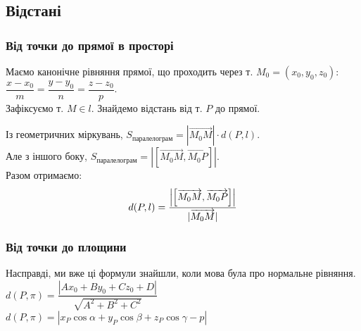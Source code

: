 \documentclass[a4paper, 10pt]{extarticle}
\theoremstyle{theoremdd}
\theoremstyle{theoremdd}
\theoremstyle{theoremdd}
\theoremstyle{theoremdd}
\theoremstyle{theoremdd}
\theoremstyle{theoremdd}
\theoremstyle{theoremdd}
\theoremstyle{theoremdd}
\begin{document}
\subsection{Відстані}
\subsubsection{Від точки до прямої в просторі}
Маємо канонічне рівняння прямої, що проходить через т. $M_0 = (x_0,y_0,z_0)$:\\
$\dfrac{x-x_0}{m} = \dfrac{y-y_0}{n} = \dfrac{z-z_0}{p}$.\\
Зафіксуємо т. $M \in l$. Знайдемо відстань від т. $P$ до прямої.
\begin{figure}[H]
\centering
{}
\end{figure}
Із геометричних міркувань, $S_{\textrm{паралелограм}} = |\overrightarrow{M_0M}| \cdot d(P,l)$.\\
Але з іншого боку, $S_{\textrm{паралелограм}} = |[\overrightarrow{M_0M},\overrightarrow{M_0P}]|$.\\
Разом отримаємо:
\begin{align*}
d(P,l)= \dfrac{\abs{\left[\overrightarrow{M_0M},\overrightarrow{M_0P} \right]}}{|\overrightarrow{M_0 M}|}
\end{align*}

\subsubsection{Від точки до площини}
Насправді, ми вже ці формули знайшли, коли мова була про нормальне рівняння.\\
$d(P,\pi) = \dfrac{|Ax_0+By_0+Cz_0+D|}{\sqrt{A^2+B^2+C^2}}$\\
$d(P,\pi) = |x_P \cos \alpha + y_P \cos \beta +z_P \cos \gamma - p|$
\end{document}
